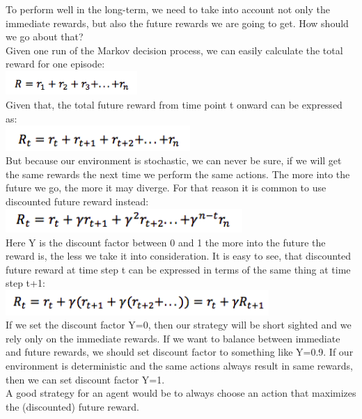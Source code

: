 \documentclass[twoside,letterpaper]{article}
\begin{document}
{\color{black}
To perform well in the long-term, we need to take into account not only the immediate rewards, but also the future rewards we are going to get. How should we go about that?\\

Given one run of the Markov decision process, we can easily calculate the total reward for one episode:\\
\centering
\includegraphics[width=5cm]{images/dfr.png}\\
Given that, the total future reward from time point t onward can be expressed as:\\
\centering
\includegraphics[width=7cm]{images/dfr2.png}\\
But because our environment is stochastic, we can never be sure, if we will get the same rewards the next time we perform the same actions. The more into the future we go, the more it may diverge. For that reason it is common to use discounted future reward instead:\\
\centering
\includegraphics[width=9cm]{images/dfr3.png}\\
Here Y is the discount factor between 0 and 1 the more into the future the reward is, the less we take it into consideration. It is easy to see, that discounted future reward at time step t can be expressed in terms of the same thing at time step t+1:\\
\centering
\includegraphics[width=10cm]{images/dfr4.png}\\
If we set the discount factor Y=0, then our strategy will be short sighted and we rely only on the immediate rewards. If we want to balance between immediate and future rewards, we should set discount factor to something like Y=0.9. If our environment is deterministic and the same actions always result in same rewards, then we can set discount factor Y=1.\\

A good strategy for an agent would be to always choose an action that maximizes the (discounted) future reward.
}
\end{document}
